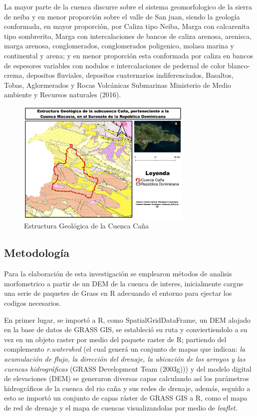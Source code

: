 \documentclass[11pt,]{article}
\begin{document}
La mayor parte de la cuenca discurre sobre el sistema geomorfologico de
la sierra de neiba y en menor proporción sobre el valle de San juan,
siendo la geología conformada, en mayor proporción, por Caliza tipo
Neiba, Marga con calcarenita tipo sombrerito, Marga con intercalaciones
de bancos de caliza arenosa, arenisca, marga arenosa, conglomerados,
conglomerados poligenico, molasa marina y continental y arena; y en
menor proporción esta conformada por caliza en bancos de espesores
variables con nodulos e intercalaciones de pedernal de color
blanco-crema, depositos fluviales, depositos cuaternarios
indiferenciados, Basaltos, Tobas, Aglormerados y Rocas Volcánicas
Submarinas Ministerio de Medio ambiente y Recursos naturales (2016).

\begin{figure}
\centering
\includegraphics[width=0.75000\textwidth]{mapa_geologico_cuenca_cana.jpg}
\caption{Estructura Geológica de la Cuenca Caña}
\end{figure}

\subsection{Metodología}\label{metodologuxeda-1}

Para la elaboración de esta investigación se emplearon métodos de
analisis morfometrico a partir de un DEM de la cuenca de interes,
inicialmente cargue una serie de paquetes de Grass en R adecuando el
entorno para ejectar los codigos necesarios.

En primer lugar, se importó a R, como SpatialGridDataFrame, un DEM
alojado en la base de datos de GRASS GIS, se estableció su ruta y
conviertiendolo a su vez en un objeto raster por medio del paquete
raster de R; partiendo del complemento \emph{r.watershed} (el cual
generá un conjunto de mapas que indican: \emph{la acumulación de flujo,
la dirección del drenaje, la ubicación de los arroyos y las cuencas
hidrográficas} (GRASS Development Team (2003g))) y del modelo digital de
elevaciones (DEM) se generaron diversas capas calculando así los
parámetros hidrográficos de la cuenca del rio caña y sus redes de
drenaje, además, seguido a esto se importó un conjunto de capas ráster
de GRASS GIS a R, como el mapa de red de drenaje y el mapa de cuencas
visualizandolas por medio de \emph{leaflet}.
\end{document}
